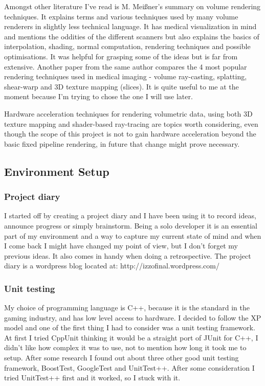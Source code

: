 \documentclass[11pt,fleqn,twoside]{article}
\begin{document}
Amongst other literature I've read is M. Mei\ss{}ner's summary on volume rendering techniques\cite{VolumeRenderingTut}. It explains terms and various techniques used by many volume renderers in slightly less technical language. It has medical visualization in mind and mentions the oddities of the different scanners but also explains the basics of interpolation, shading, normal computation, rendering techniques and possible optimisations. It was helpful for grasping some of the ideas but is far from extensive. Another paper from the same author\cite{AlgorithmComparison} compares the 4 most popular rendering techniques used in medical imaging - volume ray-casting, splatting, shear-warp and 3D texture mapping (slices). It is quite useful to me at the moment because I'm trying to chose the one I will use later.

Hardware acceleration techniques\cite{GPUAccelTech} for rendering volumetric data, using both 3D texture mapping\cite{GPUGemsCh39} and shader-based ray-tracing are topics worth considering, even though the scope of this project is not to gain hardware acceleration beyond the basic fixed pipeline rendering, in future that change might prove necessary.

\subsection{Environment Setup}


\subsubsection{Project diary}
\label{sec:projectDiary}

I started off by creating a project diary and I have been using it to record ideas, announce progress or simply brainstorm. Being a solo developer it is an essential part of my environment and a way to capture my current state of mind and when I come back I might have changed my point of view, but I don't forget my previous ideas. It also comes in handy when doing a retrospective. The project diary is a wordpress blog located at:
http://izzofinal.wordpress.com/


\subsubsection{Unit testing}
My choice of  programming language is C++, because it is the standard in the gaming industry, and has low level access to hardware. I decided to follow the XP model and one of the first thing I had to consider was a unit testing framework. At first I tried CppUnit thinking it would be a straight port of JUnit for C++, I didn't like how complex it was to use, not to mention how long it took me to setup. After some research I found out about three other good unit testing framework, BoostTest, GoogleTest and UnitTest++. After some consideration I tried UnitTest++ first and it worked, so I stuck with it.
\end{document}
